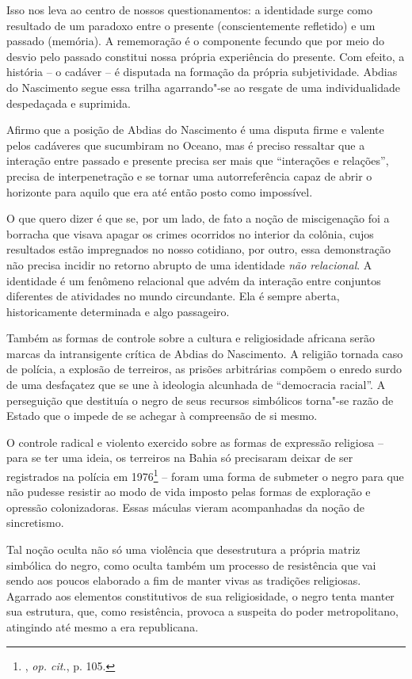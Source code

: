Isso nos leva ao centro de nossos questionamentos: a identidade surge
como resultado de um paradoxo entre o presente (conscientemente
refletido) e um passado (memória).
A rememoração é o componente
fecundo que por meio do desvio pelo passado constitui nossa própria
experiência do presente. Com efeito, a história -- o cadáver -- é
disputada na formação da própria subjetividade. Abdias do Nascimento
segue essa trilha agarrando"-se ao resgate de uma individualidade
despedaçada e suprimida.

Afirmo que a posição de Abdias do Nascimento é uma disputa firme e
valente pelos cadáveres que sucumbiram no Oceano, mas é preciso
ressaltar que a interação entre passado e presente precisa ser mais que
``interações e relações'', precisa de interpenetração e se tornar uma
autorreferência capaz de abrir o horizonte para aquilo que era até então
posto como impossível.

O que quero dizer é que se, por um lado, de fato a noção de miscigenação
foi a borracha que visava apagar os crimes ocorridos no interior da
colônia, cujos resultados estão impregnados no nosso cotidiano, por
outro, essa demonstração não precisa incidir no retorno abrupto de uma
identidade \emph{não relacional}. A identidade é um fenômeno relacional
que advém da interação entre conjuntos diferentes de atividades no mundo
circundante. Ela é sempre aberta, historicamente determinada e algo
passageiro.

\asterisc

Também as formas de controle sobre a cultura e religiosidade africana
serão marcas da intransigente crítica de Abdias do Nascimento. A
religião tornada caso de polícia, a explosão de terreiros, as prisões
arbitrárias compõem o enredo surdo de uma desfaçatez que se une à
ideologia alcunhada de ``democracia racial''. A perseguição que destituía
o negro de seus recursos simbólicos torna"-se razão de Estado que o
impede de se achegar à compreensão de si mesmo.

O controle radical e violento exercido sobre as formas de expressão
religiosa -- para se ter uma ideia, os terreiros na Bahia só precisaram
deixar de ser registrados na polícia em 1976\footnote{, \emph{op.
  cit.}, p. 105.} -- foram uma forma de submeter o negro para que não
pudesse resistir ao modo de vida imposto pelas formas de exploração e
opressão colonizadoras. Essas máculas vieram acompanhadas da noção de
sincretismo.

Tal noção oculta não só uma violência que desestrutura a própria matriz
simbólica do negro, como oculta também um processo de resistência que
vai sendo aos poucos elaborado a fim de manter vivas as tradições
religiosas. Agarrado aos elementos constitutivos de sua religiosidade, o
negro tenta manter sua estrutura, que, como resistência, provoca a
suspeita do poder metropolitano, atingindo até mesmo a era republicana.

